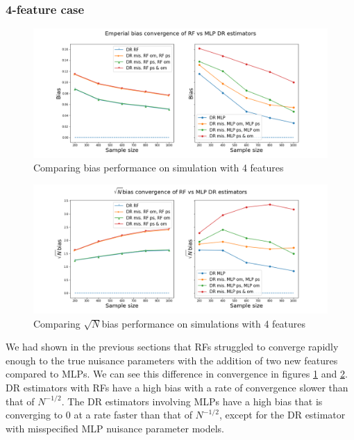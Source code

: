 \documentclass[12pt,twoside]{article}
\begin{document}
\subsubsection{4-feature case} \label{4 features}

\begin{figure}[h!]
    \centering
    \includegraphics[width = 0.9\columnwidth]{figures/biascompare_moreW.png}
    \caption{Comparing bias performance on simulation with 4 features}
    \label{biascompare_moreW}
\end{figure}

\begin{figure}[h!]
    \centering
    \includegraphics[width = 0.9\columnwidth]{figures/sqrtncompare_moreW.png}
    \caption{Comparing $\sqrt{N}$bias performance on simulations with 4 features}
    \label{sqrtncompare_moreW}
\end{figure}

We had shown in the previous sections that RFs struggled to converge rapidly enough to the true nuisance parameters with the addition of two new features compared to MLPs. We can see this difference in convergence in figures \ref{biascompare_moreW} and \ref{sqrtncompare_moreW}. DR estimators with RFs have a high bias with a rate of convergence slower than that of $N^{-1/2}$. The DR estimators involving MLPs have a high bias that is converging to 0 at a rate faster than that of $N^{-1/2}$, except for the DR estimator with misspecified MLP nuisance parameter models.
\end{document}
